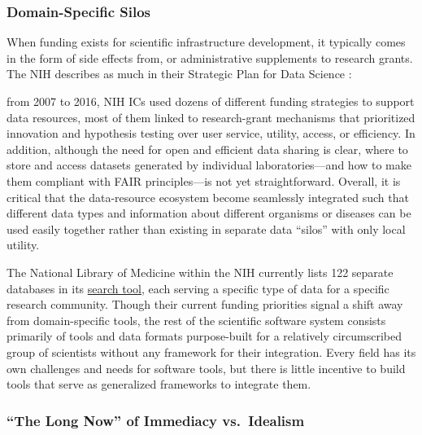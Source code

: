 \documentclass[10pt]{article}
\begin{document}
\begin{multicols}{2}
\hypertarget{domain-specific-silos}{%
\subsubsection{Domain-Specific Silos}\label{domain-specific-silos}}

When funding exists for scientific infrastructure development, it
typically comes in the form of side effects from, or administrative
supplements to research grants. The NIH describes as much in their
Strategic Plan for Data Science \cite{NIHStrategicPlan2018} :

\begin{leftbar}
from 2007 to 2016, NIH ICs used dozens of different funding strategies
to support data resources, most of them linked to research-grant
mechanisms that prioritized innovation and hypothesis testing over user
service, utility, access, or efficiency. In addition, although the need
for open and efficient data sharing is clear, where to store and access
datasets generated by individual laboratories---and how to make them
compliant with FAIR principles---is not yet straightforward. Overall, it
is critical that the data-resource ecosystem become seamlessly
integrated such that different data types and information about
different organisms or diseases can be used easily together rather than
existing in separate data ``silos'' with only local utility.
\end{leftbar}

The National Library of Medicine within the NIH currently lists 122
separate databases in its
\href{https://eresources.nlm.nih.gov/nlm_eresources/}{search tool}, each
serving a specific type of data for a specific research community.
Though their current funding priorities signal a shift away from
domain-specific tools, the rest of the scientific software system
consists primarily of tools and data formats purpose-built for a
relatively circumscribed group of scientists without any framework for
their integration. Every field has its own challenges and needs for
software tools, but there is little incentive to build tools that serve
as generalized frameworks to integrate them.

\hypertarget{the-long-now-of-immediacy-vs.-idealism}{%
\subsubsection{``The Long Now'' of Immediacy
vs.~Idealism}\label{the-long-now-of-immediacy-vs.-idealism}}


\end{multicols}
\end{document}
